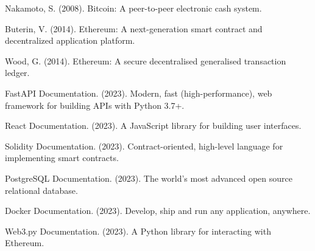 \documentclass[12pt,a4paper]{article}
\begin{document}

\begin{thebibliography}{9}

Nakamoto, S. (2008). Bitcoin: A peer-to-peer electronic cash system.

Buterin, V. (2014). Ethereum: A next-generation smart contract and decentralized application platform.

Wood, G. (2014). Ethereum: A secure decentralised generalised transaction ledger.

FastAPI Documentation. (2023). Modern, fast (high-performance), web framework for building APIs with Python 3.7+.

React Documentation. (2023). A JavaScript library for building user interfaces.

Solidity Documentation. (2023). Contract-oriented, high-level language for implementing smart contracts.

PostgreSQL Documentation. (2023). The world's most advanced open source relational database.

Docker Documentation. (2023). Develop, ship and run any application, anywhere.

Web3.py Documentation. (2023). A Python library for interacting with Ethereum.

\end{thebibliography}
\end{document}
